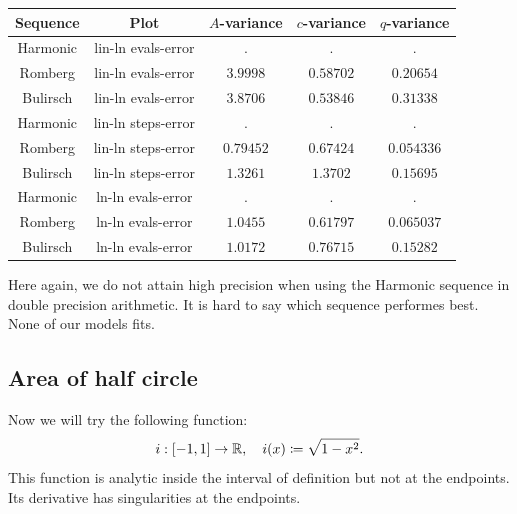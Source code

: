 \begin{table}[H]
    \centering
    \begin{tabular}{c|c||c|c|c}
Sequence & Plot & \(A\)-variance & \(c\)-variance & \(q\)-variance\\\hline
Harmonic & lin-ln evals-error & . & . & . \\
Romberg & lin-ln evals-error & \(3.9998\) & \(0.58702\) & \(0.20654\) \\
Bulirsch & lin-ln evals-error & \(3.8706\) & \(0.53846\) & \(0.31338\) \\
Harmonic & lin-ln steps-error & . & . & . \\
Romberg & lin-ln steps-error & \(0.79452\) & \(0.67424\) & \(0.054336\) \\
Bulirsch & lin-ln steps-error & \(1.3261\) & \(1.3702\) & \(0.15695\) \\
Harmonic & ln-ln evals-error & . & . & . \\
Romberg & ln-ln evals-error & \(1.0455\) & \(0.61797\) & \(0.065037\) \\
Bulirsch & ln-ln evals-error & \(1.0172\) & \(0.76715\) & \(0.15282\) \\
    \end{tabular}
    \label{tab:my_label}
\end{table}

Here again, we do not attain high precision when using the Harmonic sequence in double precision arithmetic. It is hard to say which sequence performes best. None of our models fits.

\subsection{Area of half circle}

Now we will try the following function:
\[
i: [-1, 1] \rightarrow \mathbb{R}, \quad i(x)\coloneqq \sqrt{1-x^2}.
\]
This function is analytic inside the interval of definition but not at the endpoints. Its derivative has singularities at the endpoints.

